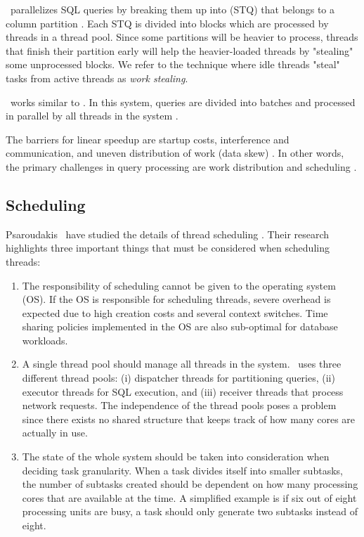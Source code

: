 \blink~parallelizes SQL queries by breaking them up into  (STQ) that belongs to a column partition \cite{Barber2012-xt}. Each STQ is divided into blocks which are processed by threads in a thread pool. Since some partitions will be heavier to process, threads that finish their partition early will help the heavier-loaded threads by "stealing" some unprocessed blocks. We refer to the technique where idle threads "steal" tasks from active threads as \textit{work stealing}. 

\mssql~works similar to \blink. In this system, queries are divided into batches and processed in parallel by all threads in the system \cite{Larson2013-mc}.

The barriers for linear speedup are startup costs, interference and communication, and uneven distribution of work (data skew) \cite{DeWitt1992-ki}. In other words, the primary challenges in query processing are work distribution and scheduling \cite{Neumann2011-uq}.

\subsection{Scheduling}
\label{sub:Scheduling}
Psaroudakis \ea~have studied the details of thread scheduling \cite{Psaroudakis2013-fn}. Their research highlights three important things that must be considered when scheduling threads:
\begin{enumerate}
  \item The responsibility of scheduling cannot be given to the operating system (OS). If the OS is responsible for scheduling threads, severe overhead is expected due to high creation costs and several context switches. Time sharing policies implemented in the OS are also sub-optimal for database workloads.
  \item A single thread pool should manage all threads in the system. \saph~uses three different thread pools: (i) dispatcher threads for partitioning queries, (ii) executor threads for SQL execution, and (iii) receiver threads that process network requests. The independence of the thread pools poses a problem since there exists no shared structure that keeps track of how many cores are actually in use.
  \item The state of the whole system should be taken into consideration when deciding task granularity. When a task divides itself into smaller subtasks, the number of subtasks created should be dependent on how many processing cores that are available at the time. A simplified example is if six out of eight processing units are busy, a task should only generate two subtasks instead of eight.
\end{enumerate}

